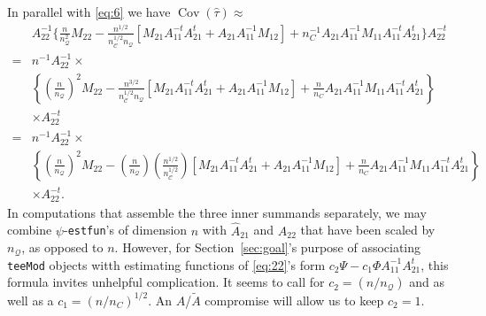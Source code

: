 \documentclass{article}
\begin{document}
  In parallel with \eqref{eq:6} we
  have $\operatorname{Cov}(\hat\tau) \approx$
  \begin{align*}
  &A_{22}^{-1}\{\frac{n}{n_{\mathcal{Q}}^{2}} M_{22} -
                                 \frac{n^{1/2}}{n_{\mathcal{C}}^{1/2}n_{\mathcal{Q}}}[M_{21}A_{11}^{-t}A_{21}^t
                                 + A_{21}A_{11}^{-1}M_{12}] +
                                 n_C^{-1}A_{21}A_{11}^{-1}M_{11}A_{11}^{-t}A_{21}^{t}\}A_{22}^{-t}\nonumber
  \\
                               =& n^{-1}A_{22}^{-1} \times\\
                                 &\left\{\left(\frac{n}{n_{\mathcal{Q}}}\right)^{2}M_{22} -
                                 \frac{n^{3/2}}{n_{\mathcal{C}}^{1/2}n_{\mathcal{Q}}}[M_{21}A_{11}^{-t}A_{21}^t
                                 + A_{21}A_{11}^{-1}M_{12}] +
                                 \frac{n}{n_C}A_{21}A_{11}^{-1}M_{11}A_{11}^{-t}A_{21}^{t}\right\}\\
    &
                                 \times A_{22}^{-t}\\
                               =& n^{-1}A_{22}^{-1} \times\\
                                 &\left\{\left(\frac{n}{n_{\mathcal{Q}}}\right)^{2}M_{22} -
                                 \left(\frac{n}{n_{\mathcal{Q}}}\right)\left(\frac{n^{1/2}}{n_{\mathcal{C}}^{1/2}}\right)[M_{21}A_{11}^{-t}A_{21}^t
                                 + A_{21}A_{11}^{-1}M_{12}] +
                                 \frac{n}{n_C}A_{21}A_{11}^{-1}M_{11}A_{11}^{-t}A_{21}^{t}\right\}\\
    &
                                 \times A_{22}^{-t}
                                . 
\end{align*}
In computations that assemble the three inner summands separately, we may combine $\psi$-\texttt{estfun}'s of dimension
$n$ with $\hat{A}_{21}$ and $\hat{A}_{22}$ that have been scaled by
$n_{\mathcal{Q}}$, as opposed to $n$.  However, for Section~\ref{sec:goal}'s purpose of
associating \texttt{teeMod} objects witth estimating functions of \eqref{eq:22}'s form $c_{2}\Psi - c_{1}\Phi
A_{11}^{-1}A_{21}^{t}$, this formula invites unhelpful
complication. It seems to call for $c_{2}=({n}/{n_{\mathcal{Q}}})$
and as well as a $c_{1}=({n}/{n_C})^{1/2}$.  An $A$/$\tilde{A}$
compromise will allow us to keep $c_{2}=1$. 
\end{document}
